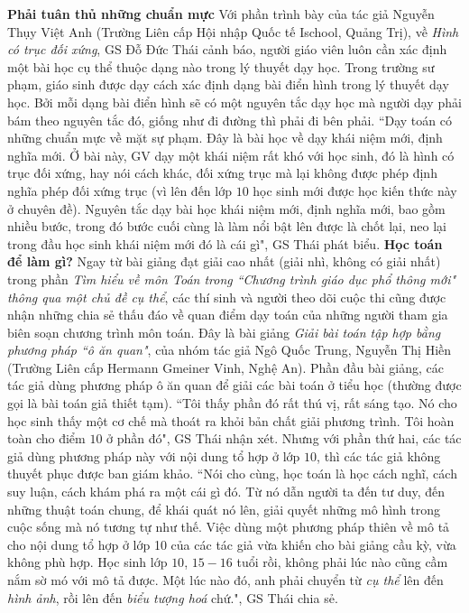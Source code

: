 \begin{multicols}{2}
	\vskip 0.1cm
	\textbf{\color{diendantoanhoc}Phải tuân thủ những chuẩn mực} 
	\vskip 0.1cm
	Với phần trình bày của tác giả Nguyễn Thụy Việt Anh (Trường Liên cấp Hội nhập Quốc tế Ischool, Quảng Trị), về \textit{Hình có trục đối xứng}, GS Đỗ Đức Thái cảnh báo, người giáo viên luôn cần xác định một bài học cụ thể thuộc dạng nào trong lý thuyết dạy học. Trong trường sư phạm, giáo sinh được dạy cách xác định dạng bài điển hình trong lý thuyết dạy học. Bởi mỗi dạng bài điển hình sẽ có một nguyên tắc dạy học mà người dạy phải bám theo nguyên tắc đó, giống như đi đường thì phải đi bên phải.  
	\vskip 0.1cm
	``Dạy toán có những chuẩn mực về mặt sự phạm. Đây là bài học về dạy khái niệm mới, định nghĩa mới. Ở bài này, GV dạy một khái niệm rất khó với học sinh, đó là hình có trục đối xứng, hay nói cách khác, đối xứng trục mà lại không được phép định nghĩa phép đối xứng trục (vì lên đến lớp $10$ học sinh mới được học kiến thức này ở chuyên đề). Nguyên tắc dạy bài học khái niệm mới, định nghĩa mới, bao gồm nhiều bước, trong đó bước cuối cùng là làm nổi bật lên được là chốt lại, neo lại trong đầu học sinh khái niệm mới đó là cái gì", GS Thái phát biểu. 
	\vskip 0.1cm
	\textbf{\color{diendantoanhoc}Học toán để làm gì?} 
	\vskip 0.1cm
	Ngay từ bài giảng đạt giải cao nhất (giải nhì, không có giải nhất) trong phần \textit{Tìm hiểu về môn Toán trong ``Chương trình giáo dục phổ thông mới" thông qua một chủ đề cụ thể}, các thí sinh và người theo dõi cuộc thi cũng được nhận những chia sẻ thấu đáo về quan điểm dạy toán của những người tham gia biên soạn chương trình môn toán. Đây là bài giảng \textit{Giải bài toán tập hợp bằng phương pháp ``ô ăn quan"}, của nhóm tác giả Ngô Quốc Trung, Nguyễn Thị Hiền (Trường Liên cấp Hermann Gmeiner Vinh, Nghệ An). Phần đầu bài giảng, các tác giả dùng phương pháp ô ăn quan để giải các bài toán ở tiểu học (thường được gọi là bài toán giả thiết tạm). ``Tôi thấy phần đó rất thú vị, rất sáng tạo. Nó cho học sinh thấy một cơ chế mà thoát ra khỏi bản chất giải phương trình. Tôi hoàn toàn cho điểm $10$ ở phần đó", GS Thái nhận xét.
	\vskip 0.1cm
	Nhưng với phần thứ hai, các tác giả dùng phương pháp này với nội dung tổ hợp ở lớp $10$, thì các tác giả không thuyết phục được ban giám khảo. ``Nói cho cùng, học toán là học cách nghĩ, cách suy luận, cách khám phá ra một cái gì đó. Từ nó dẫn người ta đến tư duy, đến những thuật toán chung, để khái quát nó lên, giải quyết những mô hình trong cuộc sống mà nó tương tự như thế. Việc dùng một phương pháp thiên về mô tả cho nội dung tổ hợp ở lớp 10 của các tác giả vừa khiến cho bài giảng cầu kỳ, vừa không phù hợp.  Học sinh lớp $10$, $15-16$ tuổi rồi, không phải lúc nào cũng cầm nắm sờ mó với mô tả được. Một lúc nào đó, anh phải chuyển từ \textit{cụ thể} lên đến \textit{hình ảnh}, rồi lên đến \textit{biểu tượng hoá} chứ.",  GS Thái chia sẻ.

\end{multicols}

